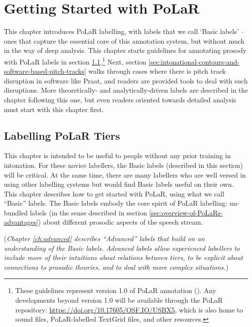 \chapter{Getting Started with PoLaR}\label{ch:basics}

This chapter introduces PoLaR labelling, with labels that we call ‘Basic labels’ – ones that capture the essential core of this annotation system, but without much in the way of deep analysis. This chapter starts guidelines for annotating prosody with PoLaR labels in section  \ref{sec:labelling-polar-tiers}.\footnote{These guidelines represent version 1.0 of PoLaR annotation (\citealt{ahn-21}). Any developments beyond version 1.0 will be available through the PoLaR repository: \href{https://doi.org/10.17605/OSF.IO/USBX5}{https://doi.org/10.17605/OSF.IO/USBX5}, which is also home to sound files, PoLaR-labelled TextGrid files, and other resources.} Next, section \ref{sec:intonational-contours-and-software-based-pitch-tracks} walks through cases where there is pitch track disruption in software like Praat, and readers are provided tools to deal with such disruptions. More theoretically- and analytically-driven labels are described in the chapter following this one, but even readers oriented towards detailed analysis must start with this chapter first.

\section{Labelling PoLaR Tiers}\label{sec:labelling-polar-tiers}

This chapter is intended to be useful to people without any prior training in intonation. For these novice labellers, the Basic labels (described in this section) will be critical. At the same time, there are many labellers who are well versed in using other labelling systems but would find Basic labels useful on their own. This chapter describes how to get started with PoLaR, using what we call “Basic” labels. The Basic labels embody the core spirit of PoLaR labelling: un-bundled labels (in the sense described in section \ref{sec:overview-of-PoLaRs-advantages}) about different prosodic aspects of the speech stream.

(\textit{Chapter \ref{ch:advanced} describes “Advanced” labels that build on an understanding of the Basic labels. Advanced labels allow experienced labellers to include more of their intuitions about relations between tiers, to be explicit about connections to prosodic theories, and to deal with more complex situations.})

